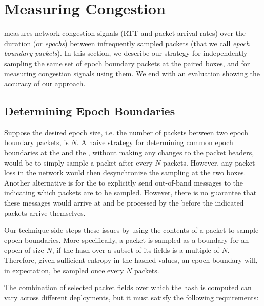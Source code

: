 \section{Measuring Congestion}\label{s:measurement}


\name measures network congestion signals (RTT and packet arrival rates) over the duration (or \emph{epochs}) between infrequently sampled packets (that we call \emph{epoch boundary packets}). In this section, we describe our strategy for independently sampling the same set of epoch boundary packets at the paired \name boxes, and for measuring congestion signals using them. We end with an evaluation showing the accuracy of our approach.

\subsection{Determining Epoch Boundaries}
\label{s:measure:marking}

Suppose the desired epoch size, i.e. the number of packets between two epoch boundary packets, is $N$. A naive strategy for determining common epoch boundaries at the \inbox and the \outbox, without making any changes to the packet headers, would be to simply sample a packet after every $N$ packets. However, any packet loss in the network would then desynchronize the sampling at the two boxes. Another alternative is for the \inbox to explicitly send out-of-band messages to the \outbox indicating which packets are to be sampled. However, there is no guarantee that these messages would arrive at and be processed by the \outbox before the indicated packets arrive themselves. 

Our technique side-steps these issues by using the contents of a packet to sample epoch boundaries. More specifically, a packet is sampled as a boundary for an epoch of size $N$, if the hash over a subset of its fields is a multiple of $N$. Therefore, given sufficient entropy in the hashed values, an epoch boundary will, in expectation, be sampled once every $N$ packets.

The combination of selected packet fields over which the hash is computed can vary across different deployments, but it must satisfy the following requirements: 

